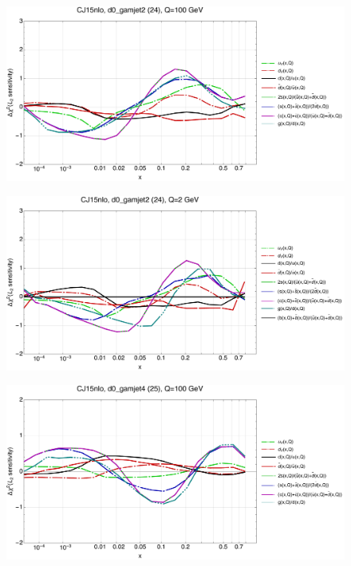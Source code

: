 \documentclass[10pt,aps,prd,floatfix,titlepage]{revtex4}
\begin{document}
\clearpage
\begin{figure}
\includegraphics[width=\textwidth,height=0.44\textheight,keepaspectratio]{2/24_CJ15nlo_q100_Sf_2.pdf}
\caption{}
\end{figure}
\begin{figure}
\includegraphics[width=\textwidth,height=0.44\textheight,keepaspectratio]{2/24_CJ15nlo_q2_Sf_2.pdf}
\caption{}
\end{figure}
\clearpage
\begin{figure}
\includegraphics[width=\textwidth,height=0.44\textheight,keepaspectratio]{2/25_CJ15nlo_q100_Sf_2.pdf}
\caption{}
\end{figure}
\end{document}
